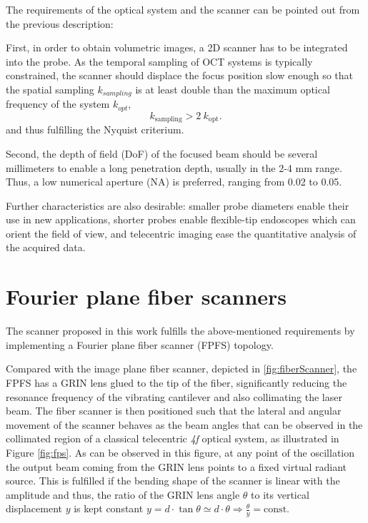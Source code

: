 \documentclass[10pt]{iopart}
\begin{document}
The requirements of the optical system and the scanner can be pointed out from the previous description: 

First, in order to obtain volumetric images, a 2D scanner has to be integrated into the probe. As the temporal sampling of OCT systems is typically constrained, the scanner should displace the focus position slow enough so that the spatial sampling $k_{sampling}$ is at least double than the maximum optical frequency of the system $k_{opt}$,
\begin{equation}
k_\mathrm{sampling} > 2 \ k_\mathrm{opt}.
\end{equation}
and thus fulfilling the Nyquist criterium.

Second, the depth of field (DoF) of the focused beam should be several millimeters to enable a long penetration depth, usually in the 2-4 mm range. Thus, a low numerical aperture (NA) is preferred, ranging from 0.02 to 0.05.

Further characteristics are also desirable: smaller probe diameters enable their use in new applications, shorter probes enable flexible-tip endoscopes which can orient the field of view, and telecentric imaging ease the quantitative analysis of the acquired data.


\section{Fourier plane fiber scanners}


The scanner proposed in this work fulfills the above-mentioned requirements by implementing a Fourier plane fiber scanner (FPFS) topology. 

Compared with the image plane fiber scanner, depicted in \autoref{fig:fiberScanner}, the FPFS has a GRIN lens glued to the tip of the fiber, significantly reducing the resonance frequency of the vibrating cantilever and also collimating the laser beam. The fiber scanner is then positioned such that the lateral and angular movement of the scanner behaves as the beam angles that can be observed in the collimated region of a classical telecentric \textit{4f} optical system, as illustrated in Figure \ref{fig:fps}. As can be observed in this figure, at any point of the oscillation the output beam coming from the GRIN lens points to a fixed virtual radiant source. This is fulfilled if the bending shape of the scanner is linear with the amplitude and thus, the ratio of the GRIN lens angle $\theta$ to its vertical displacement $y$ is kept constant $ y = d \cdot \tan \theta \simeq d \cdot \theta \Rightarrow \frac{\theta}{y} = \mathrm{const} $. 
\end{document}
